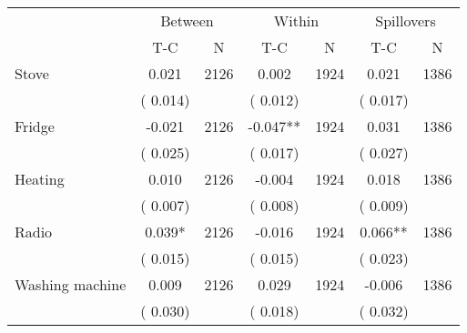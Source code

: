 
\begin{tabular}{l*{6}{c}}\hline&\multicolumn{2}{c}{Between}&\multicolumn{2}{c}{Within}&\multicolumn{2}{c}{Spillovers} \\ \cmidrule(r){2-3}\cmidrule(l){4-5}\cmidrule(l){6-7} & {T-C} & {N} & {T-C} & {N}  & {T-C}  & {N}  \\ \midrule
Stove        &              0.021      &       2126       &              0.002      &       1924       &              0.021      &       1386       \\
                       &       (       0.014)            &                               &       (       0.012)            &                               &       (       0.017)            &                               \\
Fridge        &             -0.021      &       2126       &             -0.047**      &       1924       &              0.031      &       1386       \\
                       &       (       0.025)            &                               &       (       0.017)            &                               &       (       0.027)            &                               \\
Heating        &              0.010      &       2126       &             -0.004      &       1924       &              0.018      &       1386       \\
                       &       (       0.007)            &                               &       (       0.008)            &                               &       (       0.009)            &                               \\
Radio        &              0.039*      &       2126       &             -0.016      &       1924       &              0.066**      &       1386       \\
                       &       (       0.015)            &                               &       (       0.015)            &                               &       (       0.023)            &                               \\
Washing machine        &              0.009      &       2126       &              0.029      &       1924       &             -0.006      &       1386       \\
                       &       (       0.030)            &                               &       (       0.018)            &                               &       (       0.032)            &                               \\

\end{tabular}
